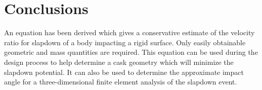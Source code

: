 \section{Conclusions}

An equation has been derived which gives a conservative estimate of the
velocity ratio for slapdown of a body impacting a rigid surface.  Only
easily obtainable geometric and mass quantities are required.  This
equation can be used during the design process to help determine a cask
geometry which will minimize the slapdown potential. It can also be used
to determine the approximate impact angle for a three-dimensional finite
element analysis of the slapdown event. 

